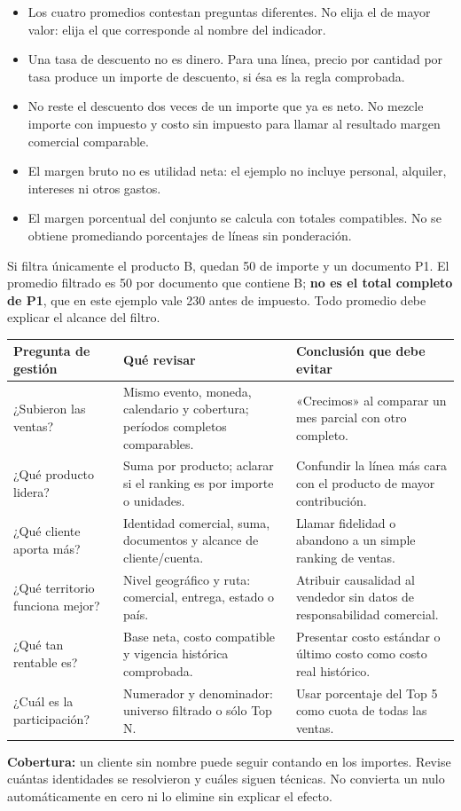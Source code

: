 \begin{itemize}
\item Los cuatro promedios contestan preguntas diferentes. No elija el de mayor valor: elija el que corresponde al nombre del indicador.
\item Una tasa de descuento no es dinero. Para una línea, precio por cantidad por tasa produce un importe de descuento, si ésa es la regla comprobada.
\item No reste el descuento dos veces de un importe que ya es neto. No mezcle importe con impuesto y costo sin impuesto para llamar al resultado margen comercial comparable.
\item El margen bruto no es utilidad neta: el ejemplo no incluye personal, alquiler, intereses ni otros gastos.
\item El margen porcentual del conjunto se calcula con totales compatibles. No se obtiene promediando porcentajes de líneas sin ponderación.
\end{itemize}
\begin{good}
Si filtra únicamente el producto B, quedan 50 de importe y un documento P1. El promedio filtrado es 50 por documento que contiene B; \textbf{no es el total completo de P1}, que en este ejemplo vale 230 antes de impuesto. Todo promedio debe explicar el alcance del filtro.
\end{good}

\begin{tabularx}{\linewidth}{@{}p{31mm}YY@{}}
\toprule
\textbf{Pregunta de gestión}&\textbf{Qué revisar}&\textbf{Conclusión que debe evitar}\\
\midrule
¿Subieron las ventas?&Mismo evento, moneda, calendario y cobertura; períodos completos comparables.&«Crecimos» al comparar un mes parcial con otro completo.\\
¿Qué producto lidera?&Suma por producto; aclarar si el ranking es por importe o unidades.&Confundir la línea más cara con el producto de mayor contribución.\\
¿Qué cliente aporta más?&Identidad comercial, suma, documentos y alcance de cliente/cuenta.&Llamar fidelidad o abandono a un simple ranking de ventas.\\
¿Qué territorio funciona mejor?&Nivel geográfico y ruta: comercial, entrega, estado o país.&Atribuir causalidad al vendedor sin datos de responsabilidad comercial.\\
¿Qué tan rentable es?&Base neta, costo compatible y vigencia histórica comprobada.&Presentar costo estándar o último costo como costo real histórico.\\
¿Cuál es la participación?&Numerador y denominador: universo filtrado o sólo Top N.&Usar porcentaje del Top 5 como cuota de todas las ventas.\\
\bottomrule
\end{tabularx}
\textbf{Cobertura:} un cliente sin nombre puede seguir contando en los importes. Revise cuántas identidades se resolvieron y cuáles siguen técnicas. No convierta un nulo automáticamente en cero ni lo elimine sin explicar el efecto.

